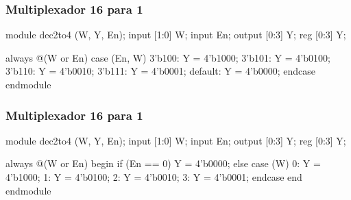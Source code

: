 
\begin{frame}[fragile]
	\frametitle{Multiplexador 16 para 1}
	\begin{verilogcode}
module dec2to4 (W, Y, En); 
  input [1:0] W;
  input En;
  output [0:3] Y;
  reg [0:3] Y;

  always @(W or En) 
    case ({En, W})
      3'b100: Y = 4'b1000; 
      3'b101: Y = 4'b0100; 
      3'b110: Y = 4'b0010; 
      3'b111: Y = 4'b0001; 
      default: Y = 4'b0000;
    endcase 
endmodule
    \end{verilogcode} 
\end{frame}

\begin{frame}[fragile]
	\frametitle{Multiplexador 16 para 1}
	\begin{verilogcode}
module dec2to4 (W, Y, En); 
  input [1:0] W;
  input En;
  output [0:3] Y;
  reg [0:3] Y;

  always @(W or En) 
  begin
    if (En == 0)
      Y = 4'b0000;
    else
      case (W)
        0: Y = 4'b1000; 
        1: Y = 4'b0100; 
        2: Y = 4'b0010; 
        3: Y = 4'b0001;
      endcase 
  end
endmodule
    \end{verilogcode} 
\end{frame}

